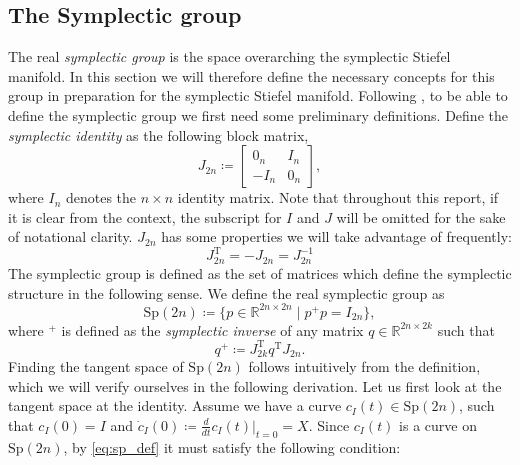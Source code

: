 \subsection{The Symplectic group}
The real \textit{symplectic group} is the space overarching the symplectic Stiefel manifold. In this section we will therefore define the necessary concepts for this group in preparation for the symplectic Stiefel manifold. Following \cite[p.~3]{BendokatZimmermann2021}, to be able to define the symplectic group we first need some preliminary definitions. Define the \textit{symplectic identity} as the following block matrix,
\begin{equation*}
    J_{2n}\coloneqq\begin{bmatrix}
        0_{n} & I_{n} \\
        -I_{n} & 0_{n}
    \end{bmatrix},
\end{equation*}
where $I_{n}$ denotes the $n\times n$ identity matrix. Note that throughout this report, if it is clear from the context, the subscript for $I$ and $J$ will be omitted for the sake of notational clarity.  $J_{2n}$ has some properties we will take advantage of frequently:
\begin{equation}\label{eq:J_2n_properties}
    J_{2n} ^{\mathrm{T}}=-J_{2n}=J_{2n}^{-1}
\end{equation}
The symplectic group is defined as the set of matrices which define the symplectic structure in the following sense. We define the real symplectic group as %
\begin{equation}\label{eq:sp_def}
    \mathrm{Sp}(2n)\coloneqq \{p\in \mathbb{R}^{2n\times2n} \;|\; p^{+}p=I_{2n}\},
\end{equation}
where $^{+}$ is defined as the \textit{symplectic inverse} of any matrix $q\in\mathbb{R}^{2n\times2k}$ such that 
\begin{equation}\label{eq:symplectic_inverse}
    q^{+}\coloneqq J_{2k}^{\mathrm{T}}q ^{\mathrm{T}}J_{2n}.
\end{equation}
Finding the tangent space of $\mathrm{Sp}(2n)$ follows  intuitively from the definition, which we will verify ourselves in the following derivation. Let us first look at the tangent space at the identity. Assume we have a curve $c_{I}(t)\in \mathrm{Sp}(2n)$, such that $c_{I}(0)=I$ and $\dot{c}_{I}(0)\coloneqq\tfrac{d}{dt}c_{I}(t)|_{t=0}=X$. Since $c_{I}(t)$ is a curve on $\mathrm{Sp}(2n)$, by \eqref{eq:sp_def} it must satisfy the following condition:
